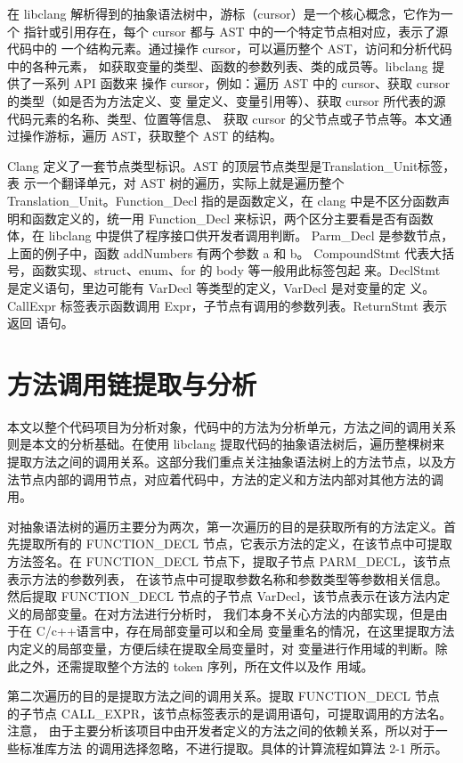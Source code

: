 在 libclang 解析得到的抽象语法树中，游标（cursor）是一个核心概念，它作为一个
指针或引用存在，每个 cursor 都与 AST 中的一个特定节点相对应，表示了源代码中的
一个结构元素。通过操作 cursor，可以遍历整个 AST，访问和分析代码中的各种元素，
如获取变量的类型、函数的参数列表、类的成员等。libclang 提供了一系列 API 函数来
操作 cursor，例如：遍历 AST 中的 cursor、获取 cursor 的类型（如是否为方法定义、变
量定义、变量引用等）、获取 cursor 所代表的源代码元素的名称、类型、位置等信息、
获取 cursor 的父节点或子节点等。本文通过操作游标，遍历 AST，获取整个 AST
的结构。


Clang 定义了一套节点类型标识。AST 的顶层节点类型是Translation\_Unit标签，表
示一个翻译单元，对 AST 树的遍历，实际上就是遍历整个 Translation\_Unit。Function\_Decl
指的是函数定义，在 clang 中是不区分函数声明和函数定义的，统一用 Function\_Decl
来标识，两个区分主要看是否有函数体，在 libclang 中提供了程序接口供开发者调用判断。
Parm\_Decl 是参数节点，上面的例子中，函数 addNumbers 有两个参数 a 和 b。
CompoundStmt 代表大括号，函数实现、struct、enum、for 的 body 等一般用此标签包起
来。DeclStmt 是定义语句，里边可能有 VarDecl 等类型的定义，VarDecl 是对变量的定
义。CallExpr 标签表示函数调用 Expr，子节点有调用的参数列表。ReturnStmt 表示返回
语句。






\section{方法调用链提取与分析}
本文以整个代码项目为分析对象，代码中的方法为分析单元，方法之间的调用关系则是本文的分析基础。在使用 libclang 提取代码的抽象语法树后，遍历整棵树来提取方法之间的调用关系。这部分我们重点关注抽象语法树上的方法节点，以及方法节点内部的调用节点，对应着代码中，方法的定义和方法内部对其他方法的调用。


对抽象语法树的遍历主要分为两次，第一次遍历的目的是获取所有的方法定义。首先提取所有的
FUNCTION\_DECL 节点，它表示方法的定义，在该节点中可提取方法签名。在
FUNCTION\_DECL 节点下，提取子节点 PARM\_DECL，该节点表示方法的参数列表，
在该节点中可提取参数名称和参数类型等参数相关信息。然后提取 FUNCTION\_DECL
节点的子节点 VarDecl，该节点表示在该方法内定义的局部变量。在对方法进行分析时，
我们本身不关心方法的内部实现，但是由于在 C/c++语言中，存在局部变量可以和全局
变量重名的情况，在这里提取方法内定义的局部变量，方便后续在提取全局变量时，对
变量进行作用域的判断。除此之外，还需提取整个方法的 token 序列，所在文件以及作
用域。


第二次遍历的目的是提取方法之间的调用关系。提取 FUNCTION\_DECL 节点
的子节点 CALL\_EXPR，该节点标签表示的是调用语句，可提取调用的方法名。注意，
由于主要分析该项目中由开发者定义的方法之间的依赖关系，所以对于一些标准库方法
的调用选择忽略，不进行提取。具体的计算流程如算法 2-1 所示。


